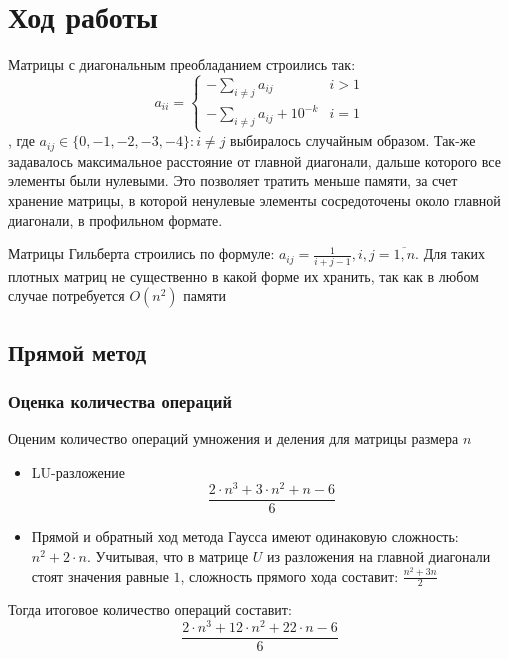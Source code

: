 \documentclass[english]{article}
\begin{document}
\section{Ход работы}
Матрицы с диагональным преобладанием строились так:
\[ a_{ii} = \begin{cases}
  -\sum\limits_{i \neq j} a_{ij} & i > 1 \\
  -\sum\limits_{i \neq j} a_{ij} + 10^{-k} & i = 1
\end{cases} \]
, где \(a_{ij} \in \{0, -1, -2, -3, -4\}: i \neq j \) выбиралось
случайным образом. Так-же задавалось максимальное расстояние от главной
диагонали, дальше которого все элементы были нулевыми. Это позволяет
тратить меньше памяти, за счет хранение матрицы, в которой ненулевые
элементы сосредоточены около главной диагонали, в профильном
формате.

Матрицы Гильберта строились по формуле: \(a_{ij} = \frac{1}{i + j -
  1}, i,j = \overline{1, n}\). Для таких плотных матриц не существенно
в какой форме их хранить, так как в любом случае потребуется
\(O(n^2)\) памяти

\subsection{Прямой метод}
\subsubsection{Оценка количества операций}
Оценим количество операций умножения и деления для матрицы размера \(n\)
\begin{itemize}
\item LU-разложение
  \[ \frac{2 \cdot n^3 + 3\cdot n^2 + n - 6}{6} \]
\item Прямой и обратный ход метода Гаусса имеют одинаковую сложность:
  \(n^2 + 2\cdot n\). Учитывая, что в матрице \(U\) из разложения на
  главной диагонали стоят значения равные \(1\), сложность прямого
  хода составит: \(\frac{n^2 + 3n}{2}\)
\end{itemize}
Тогда итоговое количество операций составит:
\[ \frac{2\cdot n^3 + 12\cdot n^2 + 22\cdot n - 6}{6} \]
\end{document}
